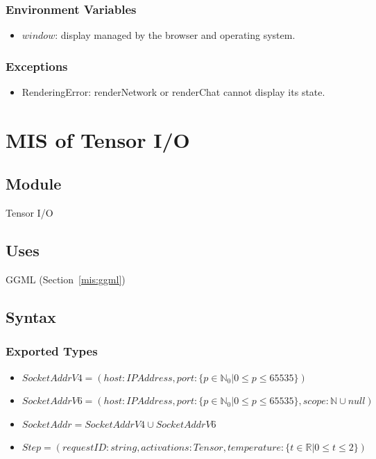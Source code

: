 \documentclass[12pt, titlepage]{article}
\begin{document}
\subsubsection{Environment Variables}

\begin{itemize}
  \item $\mathit{window}$: display managed by the browser and operating system.
\end{itemize}

\subsubsection{Exceptions}

\begin{itemize}
  \item RenderingError: renderNetwork or renderChat cannot display its state.
\end{itemize}

\newpage

\section{MIS of Tensor I/O} \label{mis:tensorio}

\subsection{Module}

Tensor I/O

\subsection{Uses}

GGML (Section~\ref{mis:ggml})

\subsection{Syntax}

\subsubsection{Exported Types}

\begin{itemize}
	\item $\mathit{SocketAddrV4} = (
		\mathit{host}: \mathit{IPAddress},
		\mathit{port}: \{p \in \mathbb{N}_0|0 \leq p \leq 65535\}
		)$
	\item $\mathit{SocketAddrV6} = (
		\mathit{host}: \mathit{IPAddress},
		\mathit{port}: \{p \in \mathbb{N}_0|0 \leq p \leq 65535\},
		\mathit{scope}: \mathbb{N} \cup \mathit{null}
		)$
	\item $\mathit{SocketAddr} = \mathit{SocketAddrV4} \cup \mathit{SocketAddrV6}$
	\item $\mathit{Step} = (
		\mathit{requestID}: string,
		\mathit{activations}: \mathit{Tensor},
		\mathit{temperature}: \{t \in \mathbb{R}|0 \leq t \leq 2\}
		)$
\end{itemize}
\end{document}
